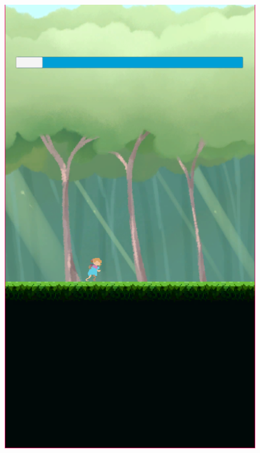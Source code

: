 \documentclass[12pt]{article}
\begin{document}
\begin{figure}[h]
\begin{minipage}{.15\textwidth}
        \includegraphics[width=\textwidth]{imgs/screenshot9.png}
    \end{minipage}
    \begin{minipage}{.15\textwidth}

\end{minipage}
\end{figure}
\end{document}
